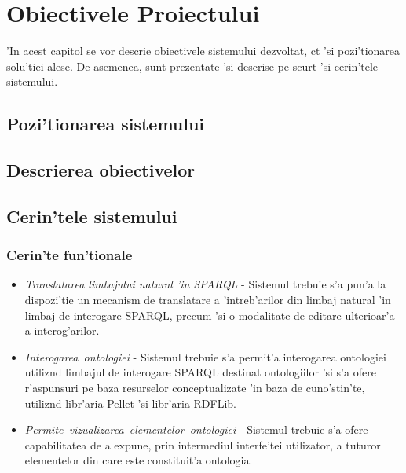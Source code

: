 \documentclass[12pt,a4paper,twoside]{report}
\begin{document}
\chapter{Obiectivele Proiectului}

'In acest capitol se vor descrie obiectivele sistemului dezvoltat, c\ia t 'si pozi'tionarea solu'tiei alese. De asemenea, sunt prezentate 'si descrise pe scurt 'si cerin'tele sistemului.

\section{Pozi'tionarea sistemului}
\section{Descrierea obiectivelor}
\section{Cerin'tele sistemului}
\subsection{Cerin'te fun'tionale}

\begin{itemize}
    \item {\it Translatarea limbajului natural 'in SPARQL} - Sistemul trebuie s'a pun'a la dispozi'tie un mecanism de translatare a 'intreb'arilor din limbaj natural 'in limbaj de interogare SPARQL, precum 'si o modalitate de editare ulterioar'a a interog'arilor.
    \item {\it Interogarea\ ontologiei} -  Sistemul trebuie s'a permit'a interogarea ontologiei utiliz\ia nd limbajul de interogare SPARQL destinat ontologiilor 'si s'a ofere r'aspunsuri pe baza resurselor conceptualizate 'in baza de cuno'stin'te, utiliz\ia nd libr'aria Pellet 'si libr'aria RDFLib.
    \item {\it Permite\ vizualizarea\ elementelor\ ontologiei} - Sistemul trebuie s'a ofere capabilitatea de a expune, prin intermediul interfe'tei utilizator, a tuturor elementelor din care este constituit'a ontologia.
\end{itemize}
\end{document}
